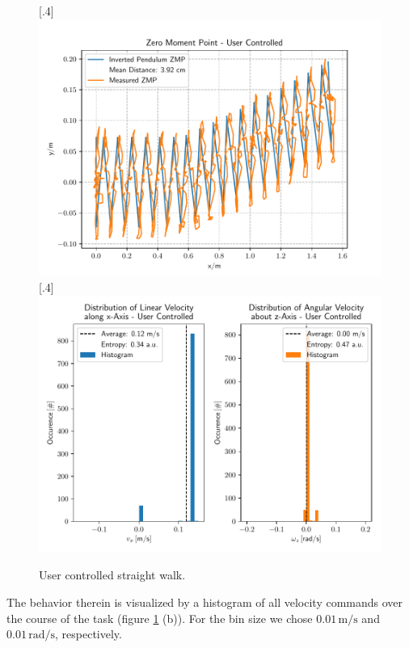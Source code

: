 \begin{figure}[h!]
	\centering
	[.4\linewidth]{\includegraphics[scale=.35]{chapters/05_experiments/01_user_controlled_walking/02_test_environment/straight_walk_01_zmp.pdf}}
	[.4\linewidth]{\includegraphics[scale=.35]{chapters/05_experiments/01_user_controlled_walking/02_test_environment/straight_walk_01_entropy.pdf}}
	\caption{User controlled straight walk.}
	\label{fig::512_uc_straight}
\end{figure} 
The behavior therein is visualized by a histogram of all velocity commands over the course of the task (figure \ref{fig::512_uc_straight} (b)). For the bin size we chose $0.01\,\text{m}/\text{s}$ and $0.01\,\text{rad}/\text{s}$, respectively. 
